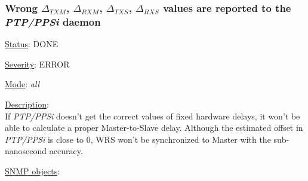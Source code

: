 \subsubsection{\bf Wrong $\Delta_{TXM}$, $\Delta_{RXM}$, $\Delta_{TXS}$,
		$\Delta_{RXS}$ values are reported to the \emph{PTP/PPSi} daemon}
		\label{fail:timing:deltas_report}
		\begin{packed_enum}
			\item [] \underline{Status}: DONE
			\item [] \underline{Severity}: ERROR
			\item [] \underline{Mode}: \emph{all}
			\item [] \underline{Description}:\\
				If \emph{PTP/PPSi} doesn't get the correct values of fixed hardware delays,
				it won't be able to calculate a proper Master-to-Slave delay. Although
				the estimated offset in \emph{PTP/PPSi} is close to 0, WRS won't be
				synchronized to Master with the sub-nanosecond accuracy.
			\item [] \underline{SNMP objects}:\\
				\\
				\\
				\\
				\\
		\end{packed_enum}

